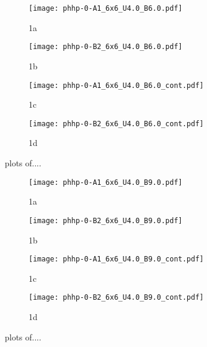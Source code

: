 \begin{figure}
  \begin{subfigure}{.5\textwidth}
    \centering
    \texttt{[image: phhp-0-A1\_6x6\_U4.0\_B6.0.pdf]}
    \caption{1a}
    \label{fig:sfig1}
  \end{subfigure}%
  \begin{subfigure}{.5\textwidth}
    \centering
    \texttt{[image: phhp-0-B2\_6x6\_U4.0\_B6.0.pdf]}
    \caption{1b}
    \label{fig:sfig2}
  \end{subfigure}
  \begin{subfigure}{.5\textwidth}
      \centering
      \texttt{[image: phhp-0-A1\_6x6\_U4.0\_B6.0\_cont.pdf]}
      \caption{1c}
      \label{fig:sfig3}
  \end{subfigure}
  \begin{subfigure}{.5\textwidth}
      \centering
      \texttt{[image: phhp-0-B2\_6x6\_U4.0\_B6.0\_cont.pdf]}
      \caption{1d}
      \label{fig:sfig4}
  \end{subfigure}
  \caption{plots of....}
  \label{fig:fig}
\end{figure}

\begin{figure}
  \begin{subfigure}{.5\textwidth}
    \centering
    \texttt{[image: phhp-0-A1\_6x6\_U4.0\_B9.0.pdf]}
    \caption{1a}
    \label{fig:sfig1}
  \end{subfigure}%
  \begin{subfigure}{.5\textwidth}
    \centering
    \texttt{[image: phhp-0-B2\_6x6\_U4.0\_B9.0.pdf]}
    \caption{1b}
    \label{fig:sfig2}
  \end{subfigure}
  \begin{subfigure}{.5\textwidth}
      \centering
      \texttt{[image: phhp-0-A1\_6x6\_U4.0\_B9.0\_cont.pdf]}
      \caption{1c}
      \label{fig:sfig3}
  \end{subfigure}
  \begin{subfigure}{.5\textwidth}
      \centering
      \texttt{[image: phhp-0-B2\_6x6\_U4.0\_B9.0\_cont.pdf]}
      \caption{1d}
      \label{fig:sfig4}
  \end{subfigure}
  \caption{plots of....}
  \label{fig:fig}
\end{figure}

